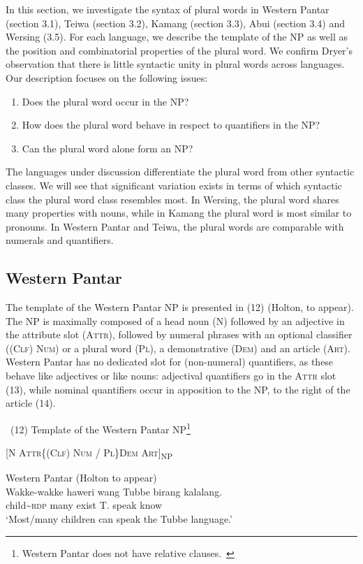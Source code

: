 In this section, we investigate the syntax of plural words in Western Pantar (section 3.1), Teiwa (section 3.2), Kamang (section 3.3), Abui (section 3.4) and Wersing (3.5). For each language, we describe the template of the NP as well as the position and combinatorial properties of the plural word. We confirm Dryer's observation that there is little syntactic unity in plural words across languages. Our description focuses on the following issues:

\begin{enumerate}
\item Does the plural word occur in the NP?
\item  How does the plural word behave in respect to quantifiers in the NP?
\item   Can the plural word alone form an NP?
\end{enumerate}

The languages under discussion differentiate the plural word from other syntactic classes. We will see that significant variation exists in terms of which syntactic class the plural word class resembles most. In Wersing, the plural word shares many properties with nouns, while in Kamang the plural word is most similar to pronouns. In Western Pantar and Teiwa, the plural words are comparable with numerals and quantifiers.

\subsection{Western Pantar}  %
The template of the Western Pantar NP is presented in (12) (Holton, to appear). The NP is maximally composed of a head noun (N) followed by an adjective in the attribute slot (\textsc{Attr),} followed by numeral phrases with an optional classifier (\textsc{(Clf)} \textsc{Num)} or a plural word (\textsc{Pl),} a demonstrative \textsc{(Dem)} and an article \textsc{(Art)}. Western Pantar has no dedicated slot for (non-numeral) quantifiers, as these behave like adjectives or like nouns: adjectival quantifiers go in the A\textsc{ttr} slot (13), while nominal quantifiers occur in apposition to the NP, to the right of the article (14).

~(12) Template of the Western Pantar NP\footnote{  Western Pantar does not have relative clauses.~}

 [\textsc{N  Attr\{(Clf) Num / Pl\}Dem  Art]}\textsc{\textsubscript{NP}}


\ea%
\label{ex:13}
Western Pantar (Holton to appear)\\
\gll  Wakke-wakke haweri wang Tubbe birang kalalang. \\
   child\~{}\textsc{rdp} many exist T. speak know  \\
\glt `Most/many children can speak the Tubbe language.'
\z







